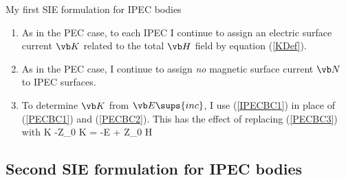 \documentclass{article}
\begin{document}
My first SIE formulation for IPEC bodies 
%
\begin{enumerate}
 \item As in the PEC case, to each IPEC I continue to assign an electric
       surface current $\vb K$ related to the total $\vb H$ field
       by equation (\ref{KDef}).
 \item As in the PEC case, I continue to assign \textit{no} magnetic 
       surface current $\vb N$ to IPEC surfaces.
 \item To determine $\vb K$ from $\vb E\sups{inc}$, I use 
        (\ref{IPECBC1}) in place of (\ref{PECBC1}) and (\ref{PECBC2}).
        This has the effect of replacing (\ref{PECBC3}) with
        {
                 \vbGamma{} \star \vb K
      -\zeta Z_0\times \vbGamma{} \star \vb K
                 = -\vb E + \zeta Z_0 \times \vb H
        }
\end{enumerate}

\subsection{Second SIE formulation for IPEC bodies}
\end{document}
